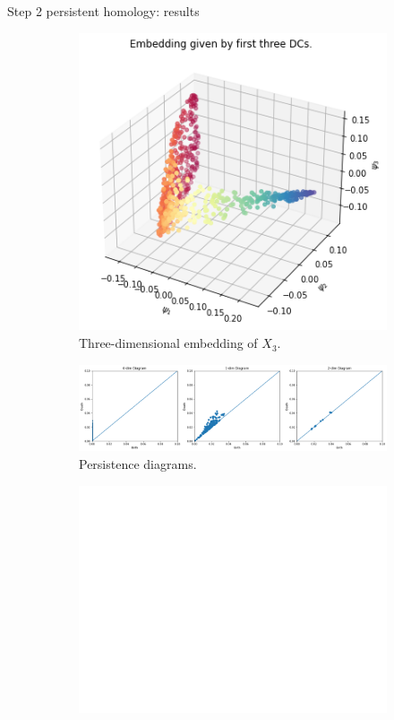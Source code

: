 \documentclass[xcolor={dvipsnames,svgnames}]{beamer}
\begin{document}
\begin{frame}{Step 2 persistent homology: results}
\begin{figure}[H]
\centering
\begin{subfigure}[b]{0.2\textwidth}
    \includegraphics[width=\textwidth]{figures/X3_embedding.png}
    \caption{Three-dimensional embedding of $X_3$.}
\end{subfigure}
\hfill
\begin{subfigure}[b]{0.75\textwidth}
    \includegraphics[width=\textwidth]{figures/X3_H0.png}
    \caption{Persistence diagrams.}
\end{subfigure}
\begin{subfigure}[b]{0.25\textwidth}
\includegraphics[width=\textwidth]{figures/white.png} 

\end{subfigure}
\end{figure}
\end{frame}
\end{document}

